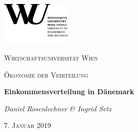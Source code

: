 \documentclass[11pt]{article}
\begin{document}
\begin{titlepage}
	\centering
	\includegraphics[width=0.25\textwidth]{wu.png}\par \vspace{1cm}
	{\scshape\LARGE Wirtschaftsuniversität Wien\par}
	\vspace{1cm}
	{\scshape\Large Ökonomie der Veirteilung\par}
	\vspace{1.5cm}
	{\huge\bfseries Einkommensverteilung in Dänemark\par}
	\vspace{2cm}
	{\Large\itshape Daniel Rosenlechner \& Ingrid Setz\par}
	\vfill
	{\scshape\Large 7. Januar 2019\par}
\end{titlepage}
\end{document}
